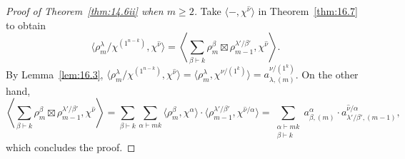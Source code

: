 \begin{proof}[Proof of Theorem~\ref{thm:14.6ii} when $m\ge 2$]
	Take $\langle -, \chi^{\hat{\nu}}\rangle$ in Theorem~\ref{thm:16.7} to obtain
	\[ \langle \rho^\lambda_m/\chi^{(1^{n-k})}, \chi^{\hat{\nu}} \rangle = \left\langle \sum_{\beta\vdash k} \rho^\beta_m\boxtimes \rho^{\lambda'/\beta'}_{m-1}, \chi^{\hat{\nu}} \right\rangle. \]
	By Lemma~\ref{lem:16.3}, $\langle \rho^\lambda_m/\chi^{(1^{n-k})}, \chi^{\hat{\nu}} \rangle = \langle \rho^\lambda_m, \chi^{\nu/(1^k)}\rangle = a^{\nu/(1^k)}_{\lambda,(m)}$. On the other hand,
	\[ \left\langle \sum_{\beta\vdash k} \rho^\beta_m\boxtimes \rho^{\lambda'/\beta'}_{m-1}, \chi^{\hat{\nu}} \right\rangle = \sum_{\beta\vdash k} \sum_{\alpha\vdash mk} \langle \rho^\beta_m,\chi^\alpha\rangle \cdot \langle \rho^{\lambda'/\beta'}_{m-1}, \chi^{\hat{\nu}/\alpha}\rangle = \sum_{\substack{\alpha\vdash mk\\\beta\vdash k}} a^\alpha_{\beta,(m)}\cdot a^{\hat{\nu}/\alpha}_{\lambda'/\beta',(m-1)}, \]
	which concludes the proof.
\end{proof}
